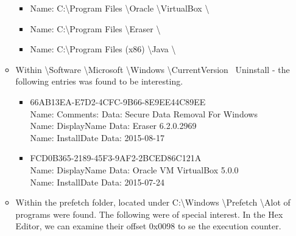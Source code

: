 \begin{enumerate}
\begin{itemize}
	\begin{itemize} 
		\item Name: C:\textbackslash Program Files \textbackslash Oracle \textbackslash VirtualBox \textbackslash
		\item Name: C:\textbackslash Program Files \textbackslash Eraser \textbackslash
		\item Name: C:\textbackslash Program Files (x86) \textbackslash Java \textbackslash\\
	\end{itemize}
	
	\item  Within \textbackslash Software \textbackslash Microsoft \textbackslash Windows \textbackslash CurrentVersion \ Uninstall - the following entries was found to be interesting.
	
	\begin{itemize}
		\item \textbraceleft 66AB13EA-E7D2-4CFC-9B66-8E9EE44C89EE \textbraceright \\
		Name: Comments: Data: Secure Data Removal For Windows \\
		Name: DisplayName Data: Eraser 6.2.0.2969 \\
		Name: InstallDate Data: 2015-08-17 \\
		
		\item \textbraceleft FCD0B365-2189-45F3-9AF2-2BCED86C121A \textbraceright \\
		Name: DisplayName Data: Oracle VM VirtualBox 5.0.0 \\
		Name: InstallDate Data: 2015-07-24 \\
		
	\end{itemize}
	
	\item Within the prefetch folder, located under C:\textbackslash Windows \textbackslash Prefetch \textbackslash Alot of programs were found. The following were of special interest. In the Hex Editor, we can examine their offset 0x0098 to se the execution counter.
	

\end{itemize}
\end{enumerate}
